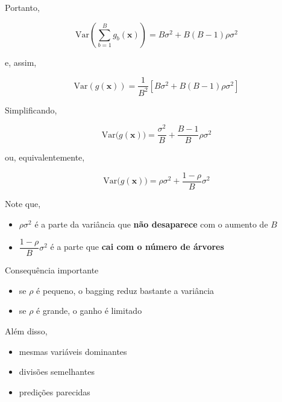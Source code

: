 \documentclass[
  ignorenonframetext,
  aspectratio=169,
]{beamer}
\providecommand{\tightlist}{%
  \setlength{\itemsep}{0pt}\setlength{\parskip}{0pt}}
\begin{document}
\begin{frame}
Portanto,

\[
\mathrm{Var}\!\left(\sum_{b=1}^{B} g_b(\mathbf{x})\right)
=
B\sigma^2 + B(B-1)\rho\sigma^2
\]

e, assim,

\[
\mathrm{Var}\!\left(g(\mathbf{x})\right)
=
\frac{1}{B^2}
\left[
B\sigma^2 + B(B-1)\rho\sigma^2
\right]
\]
\end{frame}

\begin{frame}
Simplificando,

\[
\mathrm{Var}\!\big(g(\mathbf{x})\big)
=
\frac{\sigma^2}{B}
+
\frac{B-1}{B}\rho\sigma^2
\]

ou, equivalentemente,

\[
\boxed{
\mathrm{Var}\!\big(g(\mathbf{x})\big)
=
\rho\sigma^2 + \frac{1-\rho}{B}\sigma^2
}
\]

Note que,

\begin{itemize}
\tightlist
\item
  \(\rho\sigma^2\) é a parte da variância que \textbf{não desaparece}
  com o aumento de \(B\)
\item
  \(\dfrac{1-\rho}{B}\sigma^2\) é a parte que \textbf{cai com o número
  de árvores}
\end{itemize}
\end{frame}

\begin{frame}
\begin{block}{Consequência importante}
\label{consequuxeancia-importante}
\begin{itemize}
\tightlist
\item
  se \(\rho\) é pequeno, o bagging reduz bastante a variância
\item
  se \(\rho\) é grande, o ganho é limitado
\end{itemize}

Além disso,

\begin{itemize}
\tightlist
\item
  mesmas variáveis dominantes\\
\item
  divisões semelhantes\\
\item
  predições parecidas
\end{itemize}
\end{block}
\end{frame}
\end{document}
